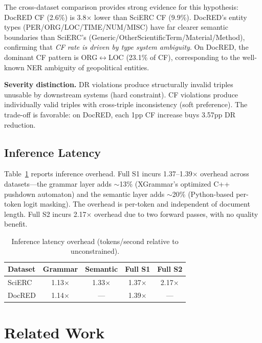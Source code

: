 \documentclass[11pt,a4paper]{article}
\begin{document}
The cross-dataset comparison provides strong evidence for this hypothesis: DocRED CF (2.6\%) is 3.8$\times$ lower than SciERC CF (9.9\%).
DocRED's entity types (PER/ORG/LOC/TIME/NUM/MISC) have far clearer semantic boundaries than SciERC's (Generic/OtherScientificTerm/Material/Method), confirming that \emph{CF rate is driven by type system ambiguity}.
On DocRED, the dominant CF pattern is ORG$\leftrightarrow$LOC (23.1\% of CF), corresponding to the well-known NER ambiguity of geopolitical entities.

\textbf{Severity distinction.}
DR violations produce structurally invalid triples unusable by downstream systems (hard constraint).
CF violations produce individually valid triples with cross-triple inconsistency (soft preference).
The trade-off is favorable: on DocRED, each 1pp CF increase buys 3.57pp DR reduction.

\subsection{Inference Latency}

Table~\ref{tab:latency} reports inference overhead.
Full S1 incurs 1.37--1.39$\times$ overhead across datasets---the grammar layer adds $\sim$13\% (XGrammar's optimized C++ pushdown automaton) and the semantic layer adds $\sim$20\% (Python-based per-token logit masking).
The overhead is per-token and independent of document length.
Full S2 incurs 2.17$\times$ overhead due to two forward passes, with no quality benefit.

\begin{table}[t]
\centering
\small
\caption{Inference latency overhead (tokens/second relative to unconstrained).}
\label{tab:latency}
\begin{tabular}{lcccc}
\toprule
\textbf{Dataset} & \textbf{Grammar} & \textbf{Semantic} & \textbf{Full S1} & \textbf{Full S2} \\
\midrule
SciERC & 1.13$\times$ & 1.33$\times$ & 1.37$\times$ & 2.17$\times$ \\
DocRED & 1.14$\times$ & --- & 1.39$\times$ & --- \\
\bottomrule
\end{tabular}
\end{table}

\section{Related Work}
\end{document}
